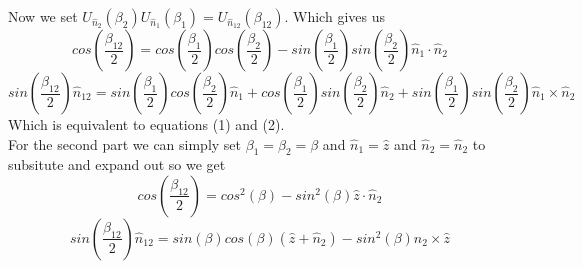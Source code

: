 \documentclass[12pt]{article}
\begin{document}
\begin{enumerate}
    Now we set $U_{\hat{n}_2} (\beta_2) U_{\hat{n}_1} (\beta_1) = U_{\hat{n}_{12}} (\beta_{12}) $. Which gives us
    $$ cos(\frac{\beta_{12}}{2}) = cos(\frac{\beta_{1}}{2})cos(\frac{\beta_2}{2})-sin(\frac{\beta_1}{2})sin(\frac{\beta_2}{2}) \hat{n}_1 \cdot \hat{n}_2 $$
    $$ sin(\frac{\beta_{12}}{2}) \hat{n}_{12} = sin(\frac{\beta_1}{2}) cos (\frac{\beta_2}{2}) \hat{n}_1 + cos(\frac{\beta_1}{2})sin(\frac{\beta_2}{2}) \hat{n}_2 + sin(\frac{\beta_1}{2})sin(\frac{\beta_2}{2}) \hat{n}_1 \times \hat{n}_2 $$
    Which is equivalent to equations (1) and (2). 
    \\
    For the second part we can simply set $\beta_1 = \beta_2 = \beta$ and $\hat{n}_1 = \hat{z}$ and $\hat{n}_2 = \hat{n}_2$ to subsitute and expand out so we get 
    $$ cos (\frac{\beta_{12}}{2}) = cos^2(\beta) - sin^2 (\beta) \hat{z} \cdot \hat{n}_2 $$
    $$ sin (\frac{\beta_{12}}{2}) \hat{n}_{12} = sin(\beta) cos(\beta) (\hat{z} + \hat{n}_2 ) - sin^2 (\beta) \hat{n}_2 \times \hat{z} $$
    

\end{enumerate}
\end{document}

